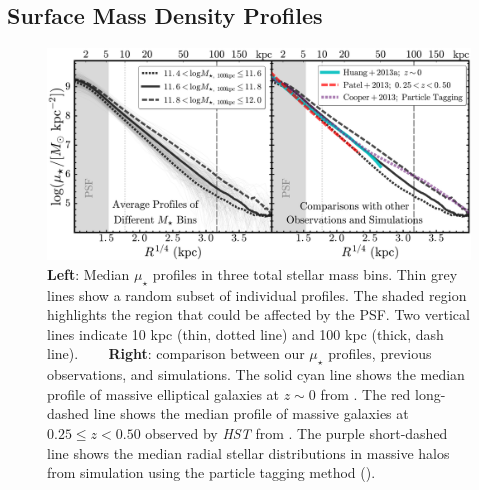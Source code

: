 \documentclass[a4paper,fleqn,usenatbib]{mnras}
\def\mden{{$\mu_{\star}$}}
\begin{document}
\subsection{Surface Mass Density Profiles}
    \label{ssec:sbp_compare}

  \begin{figure}
      \centering 
      \includegraphics[width=\textwidth]{fig/average_mass_profiles_fsps1_A}
      \caption{
          \textbf{Left}: Median \mden{} profiles in three total stellar mass bins. 
              Thin grey lines show a random subset of individual profiles. 
              The shaded region highlights the region that could be affected by the PSF. 
              Two vertical lines indicate 10 kpc (thin, dotted line) and
              100 kpc (thick, dash line). ~~~ 
          \textbf{Right}: comparison between our \mden{} profiles, previous observations, 
              and simulations. 
              The solid cyan line shows the median profile of massive elliptical 
              galaxies at $z{\sim} 0$ from \citet[][]{Huang2013a}. 
              The red long-dashed line shows the median profile of massive galaxies at 
              $0.25 \leq z < 0.50$ observed by \textit{HST} from \citet[][]{Patel2013}. 
              The purple short-dashed line shows the median radial stellar distributions 
              in massive halos from simulation using the particle tagging method
              (\citealt{Cooper2013}).}
      \label{fig:avg_prof}
  \end{figure}


\end{document}
